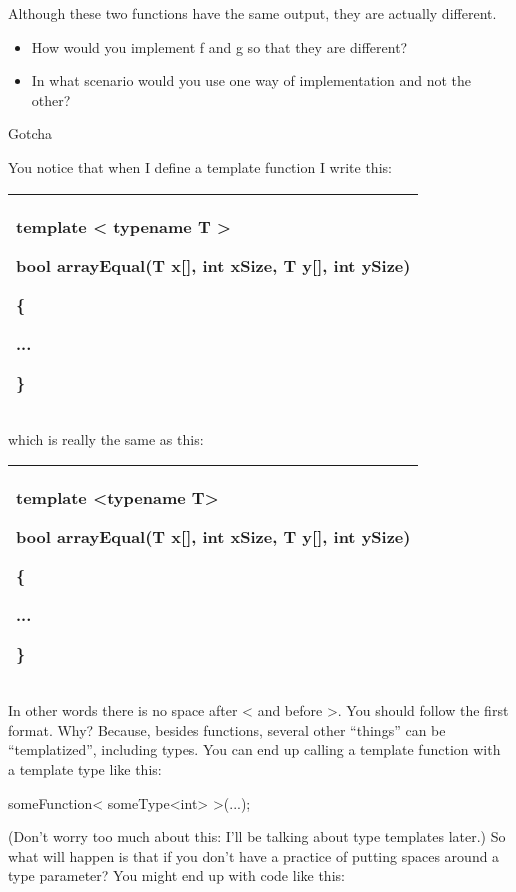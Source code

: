 \documentclass[
]{article}
\providecommand{\tightlist}{%
  \setlength{\itemsep}{0pt}\setlength{\parskip}{0pt}}
\begin{document}
Although these two functions have the same output, they are actually
different.

\begin{itemize}
\tightlist
\item
  How would you implement f and g so that they are different?
\item
  In what scenario would you use one way of implementation and not the
  other?
\end{itemize}

Gotcha

You notice that when I define a template function I write this:

\begin{longtable}[]{@{}l@{}}
\toprule
\endhead
\begin{minipage}[t]{0.97\columnwidth}\raggedright
template \textless{} typename T \textgreater{}

bool arrayEqual(T x{[}{]}, int xSize, T y{[}{]}, int ySize)

\{

...

\}\strut
\end{minipage}\tabularnewline
\bottomrule
\end{longtable}

which is really the same as this:

\begin{longtable}[]{@{}l@{}}
\toprule
\endhead
\begin{minipage}[t]{0.97\columnwidth}\raggedright
template \textless typename T\textgreater{}

bool arrayEqual(T x{[}{]}, int xSize, T y{[}{]}, int ySize)

\{

...

\}\strut
\end{minipage}\tabularnewline
\bottomrule
\end{longtable}

In other words there is no space after \textless{} and before
\textgreater. You should follow the first format. Why? Because, besides
functions, several other ``things'' can be ``templatized'', including
types. You can end up calling a template function with a template type
like this:

someFunction\textless{} someType\textless int\textgreater{}
\textgreater(...);

(Don't worry too much about this: I'll be talking about type templates
later.) So what will happen is that if you don't have a practice of
putting spaces around a type parameter? You might end up with code like
this:
\end{document}
